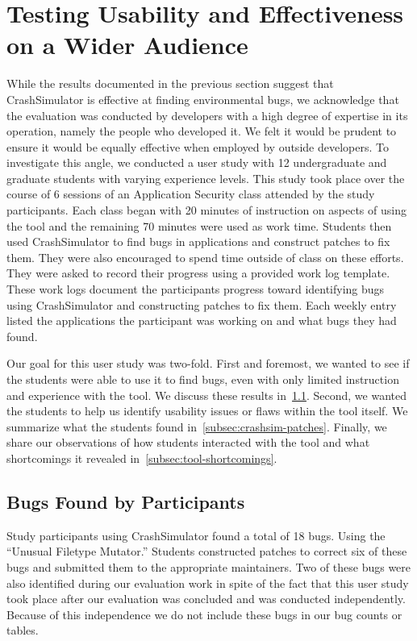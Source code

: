 \section{Testing Usability and Effectiveness on a Wider Audience}

While the results documented in the previous section suggest that CrashSimulator
is effective at finding environmental bugs, we acknowledge that the evaluation
was conducted by developers with a high degree of expertise in its operation,
namely the people who developed it.  We felt it would be prudent to ensure it
would be equally effective when employed by outside developers.
To investigate this angle,
we conducted a user study
with 12 undergraduate and graduate students with varying experience levels.
This study took place over the course of 6  sessions
of an Application Security class attended by the study participants.
Each class began with 20
minutes of instruction on aspects of using the tool
and the remaining 70 minutes were used as work time. Students then used
CrashSimulator to find bugs in applications and construct patches to fix
them.  They were also encouraged to spend time outside
of class on these efforts.  They were asked to record their progress
using a provided work log template.  These work logs document the participants
progress toward identifying bugs using CrashSimulator and constructing patches
to fix them.  Each weekly entry listed the applications the participant was
working on and what bugs they had found.

Our goal for this user study was two-fold.  First and foremost,
we wanted to see if the students were able to use it to find bugs,
even with only limited instruction and experience with the tool.
We discuss these results in~\ref{subsec:bugs-by-participants}.
Second, we wanted the students to help us identify usability issues
or flaws within the tool itself.  We summarize what the students found
in~\ref{subsec:crashsim-patches}.  Finally, we share our observations
of how students interacted with the tool and what shortcomings
it revealed in~\ref{subsec:tool-shortcomings}.

\subsection{Bugs Found by Participants}
\label{subsec:bugs-by-participants}
Study participants using CrashSimulator found a total of 18 bugs.
Using the ``Unusual Filetype Mutator.''
Students constructed patches to correct six of these bugs and submitted
them to the appropriate maintainers.  Two of these bugs were also identified
during our evaluation work in spite of the fact that this user study
took place after our evaluation was concluded and was conducted independently.
Because of this independence we do not include these bugs in our bug counts or
tables.

